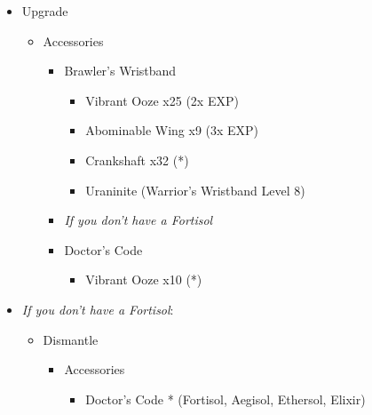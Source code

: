 \begin{multicols}{2}
\begin{upgrade}
\begin{itemize}
    \item Upgrade
    \begin{itemize}
        \item Accessories
        \begin{itemize}
            \item Brawler's Wristband
            \begin{itemize}
                \item Vibrant Ooze x25 (2x EXP)
                \item Abominable Wing x9 (3x EXP)
                \item Crankshaft x32 (*)
                \item Uraninite (Warrior's Wristband Level 8)
            \end{itemize}
            \item \textit{If you don't have a Fortisol}
            \item Doctor's Code
            \begin{itemize}
                \item Vibrant Ooze x10 (*)
            \end{itemize}
        \end{itemize}
    \end{itemize}
    \item \textit{If you don't have a Fortisol}:
    \begin{itemize}
        \item Dismantle
        \begin{itemize}
            \item Accessories
            \begin{itemize}
                \item Doctor's Code * (Fortisol, Aegisol, Ethersol, Elixir)
            \end{itemize}
        \end{itemize}
    \end{itemize}
\end{itemize}
\end{upgrade}
\end{multicols}
\newpage
